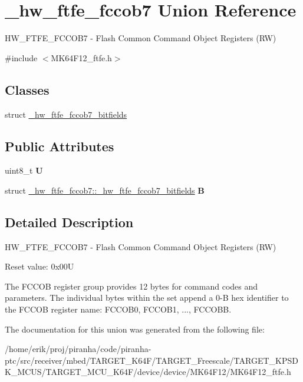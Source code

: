 \hypertarget{union__hw__ftfe__fccob7}{}\section{\+\_\+hw\+\_\+ftfe\+\_\+fccob7 Union Reference}
\label{union__hw__ftfe__fccob7}


H\+W\+\_\+\+F\+T\+F\+E\+\_\+\+F\+C\+C\+O\+B7 -\/ Flash Common Command Object Registers (RW)  




{\ttfamily \#include $<$M\+K64\+F12\+\_\+ftfe.\+h$>$}

\subsection*{Classes}
\begin{DoxyCompactItemize}
\item 
struct \hyperlink{struct__hw__ftfe__fccob7_1_1__hw__ftfe__fccob7__bitfields}{\+\_\+hw\+\_\+ftfe\+\_\+fccob7\+\_\+bitfields}
\end{DoxyCompactItemize}
\subsection*{Public Attributes}
\begin{DoxyCompactItemize}
\item 
uint8\+\_\+t {\bfseries U}\hypertarget{union__hw__ftfe__fccob7_a86fa1565074837e1f1dd2579fe8fdda4}{}\label{union__hw__ftfe__fccob7_a86fa1565074837e1f1dd2579fe8fdda4}

\item 
struct \hyperlink{struct__hw__ftfe__fccob7_1_1__hw__ftfe__fccob7__bitfields}{\+\_\+hw\+\_\+ftfe\+\_\+fccob7\+::\+\_\+hw\+\_\+ftfe\+\_\+fccob7\+\_\+bitfields} {\bfseries B}\hypertarget{union__hw__ftfe__fccob7_ae8b05f82ca5bd3394f1222e8ef928944}{}\label{union__hw__ftfe__fccob7_ae8b05f82ca5bd3394f1222e8ef928944}

\end{DoxyCompactItemize}


\subsection{Detailed Description}
H\+W\+\_\+\+F\+T\+F\+E\+\_\+\+F\+C\+C\+O\+B7 -\/ Flash Common Command Object Registers (RW) 

Reset value\+: 0x00U

The F\+C\+C\+OB register group provides 12 bytes for command codes and parameters. The individual bytes within the set append a 0-\/B hex identifier to the F\+C\+C\+OB register name\+: F\+C\+C\+O\+B0, F\+C\+C\+O\+B1, ..., F\+C\+C\+O\+BB. 

The documentation for this union was generated from the following file\+:\begin{DoxyCompactItemize}
\item 
/home/erik/proj/piranha/code/piranha-\/ptc/src/receiver/mbed/\+T\+A\+R\+G\+E\+T\+\_\+\+K64\+F/\+T\+A\+R\+G\+E\+T\+\_\+\+Freescale/\+T\+A\+R\+G\+E\+T\+\_\+\+K\+P\+S\+D\+K\+\_\+\+M\+C\+U\+S/\+T\+A\+R\+G\+E\+T\+\_\+\+M\+C\+U\+\_\+\+K64\+F/device/device/\+M\+K64\+F12/M\+K64\+F12\+\_\+ftfe.\+h\end{DoxyCompactItemize}

